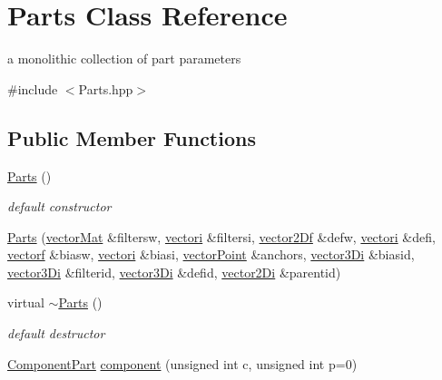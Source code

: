 \hypertarget{classParts}{\section{\-Parts \-Class \-Reference}
\label{classParts}
}


a monolithic collection of part parameters  




{\ttfamily \#include $<$\-Parts.\-hpp$>$}

\subsection*{\-Public \-Member \-Functions}
\begin{DoxyCompactItemize}
\item 
\hyperlink{classParts_a02ffe7271c4e268ee934710f91a203eb}{\-Parts} ()
\begin{DoxyCompactList}\small\item\em default constructor \end{DoxyCompactList}\item 
\hyperlink{classParts_ac8e1ad21c900825480d3f0e241808757}{\-Parts} (\hyperlink{types_8hpp_a3207a7addcfa415d1c83622febcb1e9b}{vector\-Mat} \&filtersw, \hyperlink{types_8hpp_a44529587d60e73bf0e689a82e5e70a55}{vectori} \&filtersi, \hyperlink{types_8hpp_a94f2d563f3725231a6f684b4dce4f1ef}{vector2\-Df} \&defw, \hyperlink{types_8hpp_a44529587d60e73bf0e689a82e5e70a55}{vectori} \&defi, \hyperlink{types_8hpp_a4da5db3ee9e284f719ef5764dbadffc8}{vectorf} \&biasw, \hyperlink{types_8hpp_a44529587d60e73bf0e689a82e5e70a55}{vectori} \&biasi, \hyperlink{types_8hpp_ac468fcf6870d6563ac8fa3669845afcc}{vector\-Point} \&anchors, \hyperlink{types_8hpp_a1f7c8ad00a53fb2d61b3656da9a6581d}{vector3\-Di} \&biasid, \hyperlink{types_8hpp_a1f7c8ad00a53fb2d61b3656da9a6581d}{vector3\-Di} \&filterid, \hyperlink{types_8hpp_a1f7c8ad00a53fb2d61b3656da9a6581d}{vector3\-Di} \&defid, \hyperlink{types_8hpp_a93a5e2cfd40d1ff1f10d8bbf11884c41}{vector2\-Di} \&parentid)
\item 
virtual \hyperlink{classParts_ac2df1f1a1d41444dff8ed4d4343aa64d}{$\sim$\-Parts} ()
\begin{DoxyCompactList}\small\item\em default destructor \end{DoxyCompactList}\item 
\hyperlink{classComponentPart}{\-Component\-Part} \hyperlink{classParts_a7aec123711ab73068f76b7e26a85d2d7}{component} (unsigned int c, unsigned int p=0)

\end{DoxyCompactItemize}
